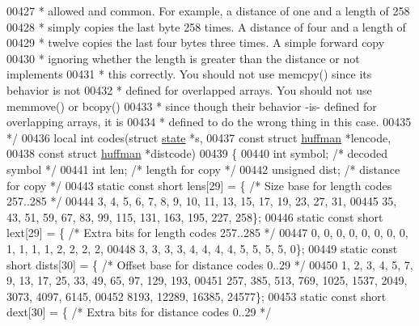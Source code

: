 \begin{DoxyCode}
00427 \textcolor{comment}{ *   allowed and common.  For example, a distance of one and a length of 258}
00428 \textcolor{comment}{ *   simply copies the last byte 258 times.  A distance of four and a length of}
00429 \textcolor{comment}{ *   twelve copies the last four bytes three times.  A simple forward copy}
00430 \textcolor{comment}{ *   ignoring whether the length is greater than the distance or not implements}
00431 \textcolor{comment}{ *   this correctly.  You should not use memcpy() since its behavior is not}
00432 \textcolor{comment}{ *   defined for overlapped arrays.  You should not use memmove() or bcopy()}
00433 \textcolor{comment}{ *   since though their behavior -is- defined for overlapping arrays, it is}
00434 \textcolor{comment}{ *   defined to do the wrong thing in this case.}
00435 \textcolor{comment}{ */}
00436 local \textcolor{keywordtype}{int} codes(\textcolor{keyword}{struct} \hyperlink{structstate}{state} *s,
00437                 \textcolor{keyword}{const} \textcolor{keyword}{struct} \hyperlink{structhuffman}{huffman} *lencode,
00438                 \textcolor{keyword}{const} \textcolor{keyword}{struct} \hyperlink{structhuffman}{huffman} *distcode)
00439 \{
00440     \textcolor{keywordtype}{int} symbol;         \textcolor{comment}{/* decoded symbol */}
00441     \textcolor{keywordtype}{int} len;            \textcolor{comment}{/* length for copy */}
00442     \textcolor{keywordtype}{unsigned} dist;      \textcolor{comment}{/* distance for copy */}
00443     \textcolor{keyword}{static} \textcolor{keyword}{const} \textcolor{keywordtype}{short} lens[29] = \{ \textcolor{comment}{/* Size base for length codes 257..285 */}
00444         3, 4, 5, 6, 7, 8, 9, 10, 11, 13, 15, 17, 19, 23, 27, 31,
00445         35, 43, 51, 59, 67, 83, 99, 115, 131, 163, 195, 227, 258\};
00446     \textcolor{keyword}{static} \textcolor{keyword}{const} \textcolor{keywordtype}{short} lext[29] = \{ \textcolor{comment}{/* Extra bits for length codes 257..285 */}
00447         0, 0, 0, 0, 0, 0, 0, 0, 1, 1, 1, 1, 2, 2, 2, 2,
00448         3, 3, 3, 3, 4, 4, 4, 4, 5, 5, 5, 5, 0\};
00449     \textcolor{keyword}{static} \textcolor{keyword}{const} \textcolor{keywordtype}{short} dists[30] = \{ \textcolor{comment}{/* Offset base for distance codes 0..29 */}
00450         1, 2, 3, 4, 5, 7, 9, 13, 17, 25, 33, 49, 65, 97, 129, 193,
00451         257, 385, 513, 769, 1025, 1537, 2049, 3073, 4097, 6145,
00452         8193, 12289, 16385, 24577\};
00453     \textcolor{keyword}{static} \textcolor{keyword}{const} \textcolor{keywordtype}{short} dext[30] = \{ \textcolor{comment}{/* Extra bits for distance codes 0..29 */}

\end{DoxyCode}
